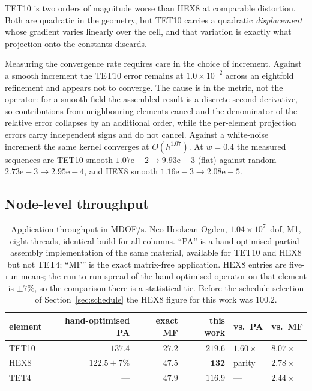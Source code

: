 \documentclass[11pt]{article}
\begin{document}
TET10 is two orders of magnitude worse than HEX8 at comparable distortion.  Both
are quadratic in the geometry, but TET10 carries a quadratic \emph{displacement}
whose gradient varies linearly over the cell, and that variation is exactly what
projection onto the constants discards.

Measuring the convergence rate requires care in the choice of increment.
Against a smooth increment the TET10 error remains at $1.0\times10^{-2}$ across
an eightfold refinement and appears not to converge.  The cause is in the metric,
not the operator: for a smooth field the assembled result is a discrete second
derivative, so contributions from neighbouring elements cancel and the
denominator of the relative error collapses by an additional order, while the
per-element projection errors carry independent signs and do not cancel.  Against
a white-noise increment the same kernel converges at $O(h^{1.07})$.  At $w=0.4$
the measured sequences are TET10 smooth $1.07\mathrm{e}{-}2 \rightarrow
9.93\mathrm{e}{-}3$ (flat) against random $2.73\mathrm{e}{-}3 \rightarrow
2.95\mathrm{e}{-}4$, and HEX8 smooth $1.16\mathrm{e}{-}3 \rightarrow
2.08\mathrm{e}{-}5$.

\subsection{Node-level throughput}
\label{sec:throughput}

\begin{table}[ht]
\centering
\begin{tabular}{lrrrll}
\toprule
element & hand-optimised PA & exact MF & this work & vs.\ PA & vs.\ MF \\
\midrule
TET10 & $137.4$         & $27.2$ & $\mathbf{219.6}$ & $1.60\times$ & $8.07\times$ \\
HEX8  & $122.5 \pm 7\%$ & $47.5$ & $\mathbf{132}$   & parity       & $2.78\times$ \\
TET4  & ---             & $47.9$ & $\mathbf{116.9}$ & ---          & $2.44\times$ \\
\bottomrule
\end{tabular}
\caption{Application throughput in MDOF/s.  Neo-Hookean Ogden,
$1.04\times10^{7}$~dof, M1, eight threads, identical build for all columns.
``PA'' is a hand-optimised partial-assembly implementation of the same material,
available for TET10 and HEX8 but not TET4; ``MF'' is the exact matrix-free
application.  HEX8 entries are five-run means; the run-to-run spread of the
hand-optimised operator on that element is $\pm7\%$, so the comparison there is
a statistical tie.  Before the schedule selection of Section~\ref{sec:schedule}
the HEX8 figure for this work was $100.2$.}
\label{tab:throughput}
\end{table}
\end{document}
